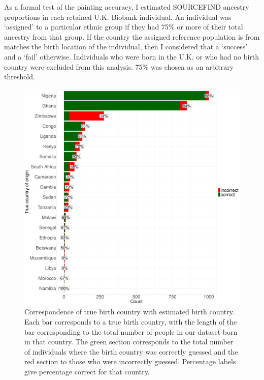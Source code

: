 As a formal test of the painting accuracy, I estimated SOURCEFIND ancestry proportions in each retained U.K. Biobank individual. An individual was `assigned' to a particular ethnic group if they had 75\% or more of their total ancestry from that group. If the country the assigned reference population is from matches the birth location of the individual, then I considered that a `success' and a `fail' otherwise. Individuals who were born in the U.K. or who had no birth country were excluded from this analysis. 75\% was chosen as an arbitrary threshold. 

\begin{figure}[htp]
    \centering
    \includegraphics[width=1.0\textwidth]{../images/chapter3/country_of_origin_allInds.pdf}
    \caption{Correspondence of true birth country with estimated birth country. Each bar corresponds to a true birth country, with the length of the bar corresponding to the total number of people in our dataset born in that country. The green section corresponds to the total number of individuals where the birth country was correctly guessed and the red section to those who were incorrectly guessed. Percentage labels give percentage correct for that country.}
    \label{fig:country_of_origin_allInds}
\end{figure}

